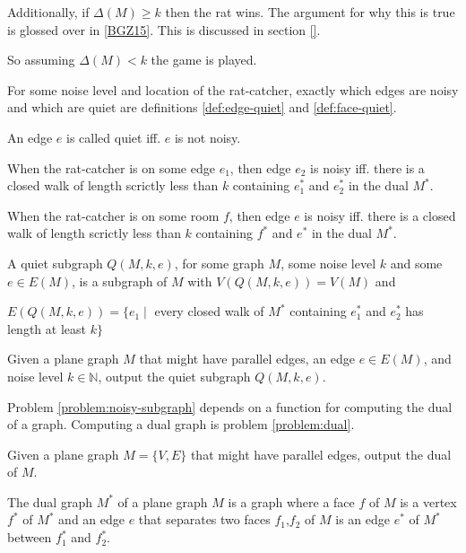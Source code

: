 \documentclass{article}
\begin{document}
	Additionally, if $\Delta(M) \geq k$ then the rat wins. The argument for why this is true is glossed over in \ref{BGZ15}. This is discussed in section \ref{}.

	So assuming $\Delta(M) < k$ the game is played.

	For some noise level and location of the rat-catcher, exactly which edges are noisy and which are quiet are definitions \ref{def:edge-quiet} and \ref{def:face-quiet}.

	An edge $e$ is called quiet iff. $e$ is not noisy.

	\begin{definition}\label{def:edge-quiet}
		When the rat-catcher is on some edge $e_1$, then edge $e_2$ is noisy iff. there is a closed walk of length scrictly less than $k$ containing $e_1^*$ and $e_2^*$ in the dual $M^*$.
	\end{definition}

	\begin{definition}\label{def:face-quiet}
		When the rat-catcher is on some room $f$, then edge $e$ is noisy iff. there is a closed walk of length scrictly less than $k$ containing $f^*$ and $e^*$ in the dual $M^*$.
	\end{definition}

	A quiet subgraph $Q(M, k, e)$, for some graph $M$, some noise level $k$ and some $e \in E(M)$, is a subgraph of $M$ with $V(Q(M, k, e)) = V(M)$ and

	$E(Q(M, k, e)) = \{e_1 \mid$ every closed walk of $M^*$ containing $e_1^*$ and $e_2^*$ has length at least $k\}$

	\begin{problem}\label{problem:noisy-subgraph}
		Given a plane graph $M$ that might have parallel edges, an edge $e \in E(M)$, and noise level $k \in \mathbb{N}$, output the quiet subgraph $Q(M, k, e)$.
	\end{problem}

	Problem \ref{problem:noisy-subgraph} depends on a function for computing the dual of a graph. Computing a dual graph is problem \ref{problem:dual}.

	\begin{problem}\label{problem:dual}
		Given a plane graph $M = \{V, E\}$ that might have parallel edges, output the dual of $M$.
	\end{problem}

	\begin{definition}
		The dual graph $M^*$ of a plane graph $M$ is a graph where a face $f$ of $M$ is a vertex $f^*$ of $M^*$ and an edge $e$ that separates two faces $f_1$,$f_2$ of $M$ is an edge $e^*$ of $M^*$ between $f_1^*$ and $f_2^*$.
	\end{definition}
	
\end{document}
